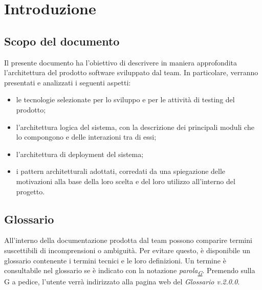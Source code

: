 \documentclass[a4paper,12pt]{article}
\begin{document}
\newpage

\tableofcontents





\newpage
\section{Introduzione}

    \subsection{Scopo del documento}
        Il presente documento ha l'obiettivo di descrivere in maniera approfondita l'architettura del prodotto software sviluppato dal team.
        In particolare, verranno presentati e analizzati i seguenti aspetti:
        \begin{itemize}
            \item le tecnologie selezionate per lo sviluppo e per le attività di testing del prodotto;
            \item l'architettura logica del sistema, con la descrizione dei principali moduli che lo compongono e delle interazioni tra di essi;
            \item l'architettura di deployment del sistema;
            \item i pattern architetturali adottati, corredati da una spiegazione delle motivazioni alla base della loro scelta e del loro utilizzo all'interno del progetto.
        \end{itemize}
        
    \subsection{Glossario}
        All'interno della documentazione prodotta dal team possono comparire termini suscettibili di incomprensioni o ambiguità. Per evitare questo, è disponibile un glossario
        contenente i termini tecnici e le loro definizioni. Un termine è consultabile nel glossario se è indicato con la notazione \textit{parola\textsubscript{\href{https://atlasteam9.github.io/Atlas/glossario.html}{G}}}.
        Premendo sulla G a pedice, l'utente verrà indirizzato alla pagina web del \textit{Glossario v.2.0.0}.
    
\end{document}
